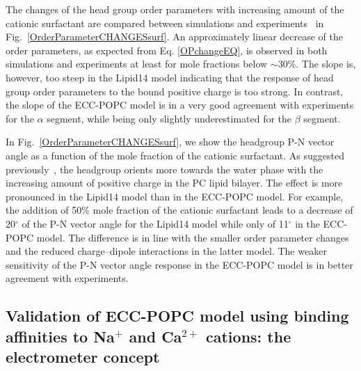 \documentclass[journal=jpcbfk,manuscript=article]{achemso}
\begin{document}
The changes of the head group order parameters with increasing amount of the cationic surfactant are compared between simulations and experiments~\cite{scherer89} in Fig.~\ref{OrderParameterCHANGESsurf}. An approximately linear decrease of the order parameters, as expected from Eq. \ref{OPchangeEQ}, is observed in both simulations and experiments at least for mole fractions below $\sim$30\%. The slope is, however, too steep in the Lipid14 model indicating that the response of head group order parameters to the bound positive charge is too strong. In contrast, the slope of the ECC-POPC model is in a very good agreement with experiments for the $\alpha$ segment, while being only slightly underestimated for the $\beta$ segment.

In Fig.~\ref{OrderParameterCHANGESsurf}, we show the headgroup P-N vector angle as a function of the mole fraction of the cationic surfactant. As suggested previously~\cite{seelig87}, the headgroup orients more towards the water phase with the increasing amount of positive charge in the PC lipid bilayer. The effect is more pronounced in the Lipid14 model than in the ECC-POPC model.   For example, the addition of 50\% mole fraction of the cationic surfactant leads to a decrease of 20$^{\circ}$ of the P-N vector angle for the Lipid14 model while only of 11$^{\circ}$ in the ECC-POPC model. The difference is in line with the smaller order parameter changes and the reduced charge--dipole interactions in the latter model. The weaker sensitivity of the P-N vector angle response in the ECC-POPC model is in better agreement with experiments.


\subsection{Validation of ECC-POPC model using binding affinities to Na$^+$ and Ca$^{2+}$ cations: the electrometer concept}
\end{document}
